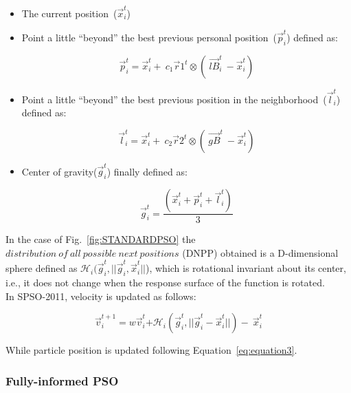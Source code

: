 \begin{itemize}
    \item The current position~(${\vec{x}}_i^t$)
    \item Point a little “beyond” the best previous personal position~(${\vec{p}}_i^t$) defined as:
    
    \begin{equation}\label{eq:bestpreviouspersonal position}
        {\vec{p}}_i^t={\vec{x}}_i^t+\ c_1{\vec{r}}1^t\otimes(\ {\vec{lB}}_i^t\ - {\vec{x}}_i^t)
    \end{equation}
    
    \item Point a little “beyond” the best previous position in the neighborhood~($ {\vec{l}}_i^t$) defined as:

      \begin{equation}\label{eq:best previous position in the neighbourhood}
        {\vec{l}}_i^t={\vec{x}}_i^t+\ c_2{\vec{r}}2^t\otimes(\ {\vec{gB}}^t\ - {\vec{x}}_i^t)
    \end{equation}
    
    \item Center of gravity(${\vec{g}}_i^t$) finally defined as:
    
    \begin{equation}\label{eq:gravitycentre}
        {\vec{g}}_i^t=\frac{\left({\vec{x}}_i^t+{\vec{p}}_i^t+{\vec{l}}_i^t\right)}{3}
    \end{equation}
    
\end{itemize}


In the case of Fig.~\ref{fig:STANDARDPSO} the $distribution~of~all~possible~next~positions$ (DNPP) obtained is a D-dimensional sphere defined as $\mathcal{H}_i({\vec{g}}_i^t, ||\vec{g}_i^t,\vec{x}_i^t||$), which is rotational invariant about its center, i.e., it does not change when the response surface of the function is rotated.\\
In SPSO-2011, velocity is updated as follows:


\begin{equation}
       {\vec{v}}_i^{t+1}=w{\vec{v}}_i^t{+\mathcal{H}}_i({\vec{g}}_i^t,||\vec{g}_i^t - \vec{x}_i^t||)-\ {\vec{x}}_i^t
\end{equation}


While particle position is updated following Equation~\eqref{eq:equation3}.

\subsubsection{Fully-informed PSO}

